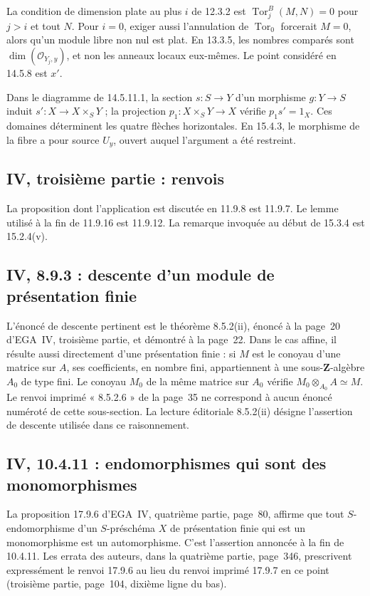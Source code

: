 \documentclass[11pt,a4paper]{article}
\begin{document}
La condition de dimension plate au plus $i$ de 12.3.2 est
$\operatorname{Tor}^B_j(M,N)=0$ pour $j>i$ et tout $N$.
Pour $i=0$, exiger aussi l'annulation de $\operatorname{Tor}_0$
forcerait $M=0$, alors qu'un module libre non nul est plat.
En 13.3.5, les nombres comparés sont
$\dim(\mathcal O_{Y_j,y})$, et non les anneaux locaux eux-mêmes.
Le point considéré en 14.5.8 est $x'$.

Dans le diagramme de 14.5.11.1, la section $s:S\to Y$ d'un
morphisme $g:Y\to S$ induit $s':X\to X\times_S Y$ ; la projection
$p_1:X\times_S Y\to X$ vérifie $p_1s'=1_X$.
Ces domaines déterminent les quatre flèches horizontales.
En 15.4.3, le morphisme de la fibre a pour source $U_y$,
ouvert auquel l'argument a été restreint.

\subsection{IV, troisième partie : renvois}
\label{note:iv3-refs}
La proposition dont l'application est discutée en 11.9.8 est 11.9.7.
Le lemme utilisé à la fin de 11.9.16 est 11.9.12.
La remarque invoquée au début de 15.3.4 est 15.2.4(v).
\par

\subsection{IV, 8.9.3 : descente d'un module de présentation finie}
L'énoncé de descente pertinent est le théorème 8.5.2(ii), énoncé à la
page~20 d'EGA~IV, troisième partie, et démontré à la page~22. Dans le
cas affine, il résulte aussi directement d'une présentation finie :
si $M$ est le conoyau d'une matrice sur $A$, ses coefficients, en
nombre fini, appartiennent à une sous-$\mathbf Z$-algèbre $A_0$ de
type fini. Le conoyau $M_0$ de la même matrice sur $A_0$ vérifie
$M_0\otimes_{A_0}A\simeq M$.
Le renvoi imprimé « 8.5.2.6 » de la page~35 ne correspond à aucun
énoncé numéroté de cette sous-section. La lecture éditoriale 8.5.2(ii)
désigne l'assertion de descente utilisée dans ce raisonnement.

\subsection{IV, 10.4.11 : endomorphismes qui sont des monomorphismes}
La proposition 17.9.6 d'EGA~IV, quatrième partie, page~80, affirme
que tout $S$-endomorphisme d'un $S$-préschéma $X$ de présentation
finie qui est un monomorphisme est un automorphisme. C'est l'assertion
annoncée à la fin de 10.4.11. Les errata des auteurs, dans la quatrième
partie, page~346, prescrivent expressément le renvoi 17.9.6 au lieu
du renvoi imprimé 17.9.7 en ce point (troisième partie, page~104,
dixième ligne du bas).
\end{document}
